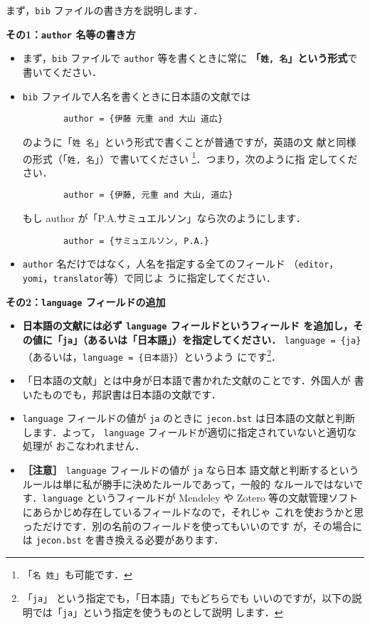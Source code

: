 \documentclass{ltjsarticle}
\begin{document}
まず，\texttt{bib} ファイルの書き方を説明します．
\vspace*{1em}

\textbf{その1：\texttt{author} 名等の書き方}
\begin{itemize}
 \item まず，\texttt{bib} ファイルで \texttt{author} 等を書くときに常に
       \textbf{「\texttt{姓,\ 名}」という形式}で書いてください．
 \item \texttt{bib} ファイルで人名を書くときに日本語の文献では
\begin{verbatim}
        author = {伊藤 元重 and 大山 道広}
\end{verbatim}
       のように「\verb|姓 名|」という形式で書くことが普通ですが，英語の文
       献と同様の形式（「\verb|姓, 名|」）で書いてください
       \footnote{「\texttt{名\ 姓}」も可能です．}．つまり，次のように指
       定してください．
\begin{verbatim}
        author = {伊藤, 元重 and 大山, 道広}
\end{verbatim}
       もし author が「P.A.サミュエルソン」なら次のようにします．
\begin{verbatim}
        author = {サミュエルソン, P.A.}
\end{verbatim}
 \item \texttt{author} 名だけではなく，人名を指定する全てのフィールド
       （\texttt{editor}，\texttt{yomi}，\texttt{translator}等）で同じよ
       うに指定してください．
\end{itemize}

\vspace*{1em}

\textbf{その2：\texttt{language} フィールドの追加}
\begin{itemize}
 \item \textbf{日本語の文献には必ず \texttt{language} フィールドというフィールド
       を追加し，その値に「\texttt{ja}」（あるいは「日本語」）を指定してください．}
       \verb|language = {ja}| （あるいは，\verb|language = {日本語}|）というよう
       にです\footnote{「\texttt{ja}」 という指定でも，「日本語」でもどちらでも
       いいのですが，以下の説明では「\texttt{ja}」という指定を使うものとして説明
       します．}．
 \item 「日本語の文献」とは中身が日本語で書かれた文献のことです．外国人が
       書いたものでも，邦訳書は日本語の文献です．
 \item \texttt{language} フィールドの値が \texttt{ja} のときに
       \texttt{jecon.bst} は日本語の文献と判断します．よって，
       \texttt{language} フィールドが適切に指定されていないと適切な処理が
       おこなわれません．
 \item \textbf{［注意］} \texttt{language} フィールドの値が \texttt{ja} なら日本
       語文献と判断するというルールは単に私が勝手に決めたルールであって，一般的
       なルールではないです．\texttt{language} というフィールドが Mendeley や
       Zotero 等の文献管理ソフトにあらかじめ存在しているフィールドなので，それじゃ
       これを使おうかと思っただけです．別の名前のフィールドを使ってもいいのです
       が，その場合には \texttt{jecon.bst} を書き換える必要があります．
\end{itemize}
\end{document}
